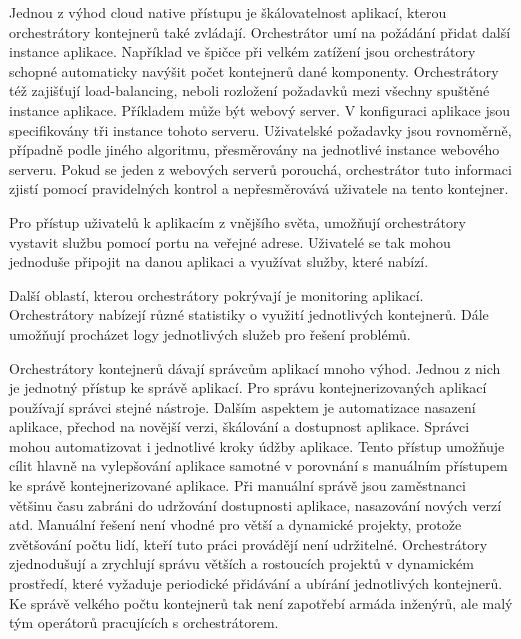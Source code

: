 \begin{itemsize}
\item Jednou z výhod cloud native přístupu je škálovatelnost aplikací, kterou orchestrátory kontejnerů také zvládají. Orchestrátor umí na požádání přidat další instance aplikace. Například ve špičce při velkém zatížení jsou orchestrátory schopné automaticky navýšit počet kontejnerů dané komponenty. Orchestrátory též zajišťují load-balancing, neboli rozložení požadavků mezi všechny spuštěné instance aplikace. Příkladem může být webový server. V konfiguraci aplikace jsou specifikovány tři instance tohoto serveru. Uživatelské požadavky jsou rovnoměrně, případně podle jiného algoritmu, přesměrovány na jednotlivé instance webového serveru. Pokud se jeden z webových serverů porouchá, orchestrátor tuto informaci zjistí pomocí pravidelných kontrol a nepřesměrovává uživatele na tento kontejner. 
\item Pro přístup uživatelů k aplikacím z vnějšího světa, umožňují orchestrátory vystavit službu pomocí portu na veřejné adrese. Uživatelé se tak mohou jednoduše připojit na danou aplikaci a využívat služby, které nabízí. 
\item Další oblastí, kterou orchestrátory pokrývají je monitoring aplikací. Orchestrátory nabízejí různé statistiky o využití jednotlivých kontejnerů. Dále umožňují procházet logy jednotlivých služeb pro řešení problémů. 
\end{itemsize}
\par
Orchestrátory kontejnerů dávají správcům aplikací mnoho výhod. Jednou z nich je jednotný přístup ke správě aplikací. Pro správu kontejnerizovaných aplikací používají správci stejné nástroje. Dalším aspektem je automatizace nasazení aplikace, přechod na novější verzi, škálování a dostupnost aplikace. Správci mohou automatizovat i jednotlivé kroky údžby aplikace. Tento přístup umožňuje cílit hlavně na vylepšování aplikace samotné v porovnání s manuálním přístupem ke správě kontejnerizované aplikace. Při manuální správě jsou zaměstnanci většinu času zabráni do udržování dostupnosti aplikace, nasazování nových verzí atd. Manuální řešení není vhodné pro větší a dynamické projekty, protože zvětšování počtu lidí, kteří tuto práci provádějí není udržitelné. Orchestrátory zjednodušují a zrychlují správu větších a rostoucích projektů v dynamickém prostředí, které vyžaduje periodické přidávání a ubírání jednotlivých kontejnerů. Ke správě velkého počtu kontejnerů tak není zapotřebí armáda inženýrů, ale malý tým operátorů pracujících s orchestrátorem. \par
